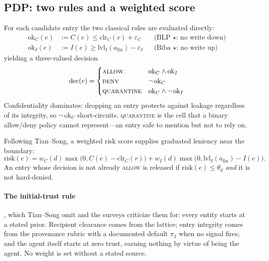 \documentclass[conference,compsoc]{IEEEtran}
\newcommand{\Cl}{\ensuremath{C}}                 %
\newcommand{\Il}{\ensuremath{I}}                 %
\newcommand{\clr}{\ensuremath{\mathrm{clr}_C}}   %
\newcommand{\lvlI}{\ensuremath{\mathrm{lvl}_I}}  %
\newcommand{\wC}{\ensuremath{w_C}}
\newcommand{\wI}{\ensuremath{w_I}}
\newcommand{\afin}{\ensuremath{a_{\mathrm{fin}}}}
\begin{document}
\subsection{PDP: two rules and a weighted score}
\label{sec:method:pdp}

For each candidate entry the two classical rules are evaluated directly:
\begin{align}
\mathrm{ok}_C(e) &:= \Cl(e) \le \clr(r) + \varepsilon_C
  &&\text{(BLP $\star$: no write down)}\\
\mathrm{ok}_I(e) &:= \Il(e) \ge \lvlI(\afin) - \varepsilon_I
  &&\text{(Biba $\star$: no write up)}
\end{align}
yielding a three-valued decision
\begin{equation}
\mathrm{dec}(e) =
\begin{cases}
\textsc{allow} & \mathrm{ok}_C \wedge \mathrm{ok}_I\\
\textsc{deny} & \neg\,\mathrm{ok}_C\\
\textsc{quarantine} & \mathrm{ok}_C \wedge \neg\,\mathrm{ok}_I
\end{cases}
\end{equation}
Confidentiality dominates: dropping an entry protects against leakage
regardless of its integrity, so $\neg\,\mathrm{ok}_C$ short-circuits.
\textsc{quarantine} is the cell that a binary allow/deny policy cannot
represent---an entry safe to mention but not to rely on.

Following Tian--Song, a weighted risk score supplies graduated leniency near
the boundary:
\begin{equation}
\mathrm{risk}(e) = \wC(d)\max\big(0, \Cl(e)-\clr(r)\big)
                 + \wI(d)\max\big(0, \lvlI(\afin)-\Il(e)\big).
\label{eq:risk}
\end{equation}
An entry whose decision is not already \textsc{allow} is released if
$\mathrm{risk}(e) \le \theta_d$ \emph{and} it is not hard-denied.

\paragraph{The initial-trust rule}, which Tian--Song omit and the surveys
criticize them for: every entity starts at a stated prior. Recipient clearance
comes from the lattice; entry integrity comes from the provenance rubric with a
documented default $\pi_I$ when no signal fires; and the agent itself starts at
zero trust, earning nothing by virtue of being the agent. No weight is set
without a stated source.
\end{document}
